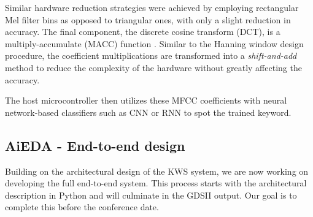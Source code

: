Similar hardware reduction strategies were achieved by employing rectangular Mel filter bins as opposed to triangular ones, with only a slight reduction in accuracy. The final component, the discrete cosine transform (DCT), is a multiply-accumulate (MACC) function \cite{chong20220}. Similar to the Hanning window design procedure, the coefficient multiplications are transformed into a \textit{shift-and-add} method to reduce the complexity of the hardware without greatly affecting the accuracy.

 The host microcontroller then utilizes these MFCC coefficients with neural network-based classifiers such as CNN or RNN to spot the trained keyword.

\subsection{AiEDA - End-to-end design}
Building on the architectural design of the KWS system, we are now working on developing the full end-to-end system. This process starts with the architectural description in Python and will culminate in the GDSII output. Our goal is to complete this before the conference date.